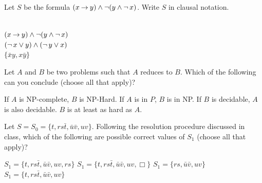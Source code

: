 \documentclass[addpoints]{exam}
\begin{document}
\begin{questions}
\question[2] Let $S$ be the formula $(x \mathbin{\rightarrow} y) \land \mathop{\neg} (y \land \mathop{\neg} x)$. Write $S$ in clausal notation.
\begin{solution}
~\\
$(x \mathbin{\rightarrow} y)\land \mathop{\neg} (y \land \mathop{\neg} x)$\\
$(\mathop{\neg} x \lor y) \land (\mathop{\neg} y \lor x)$\\
$\{\bar{x}y,x\bar{y}\}$\\
\end{solution}
\vspace{30mm}

\question[2] Let $A$ and $B$ be two problems such that $A$ reduces to $B$. Which of
the following can you conclude (choose all that apply)?
\begin{checkboxes}
\CorrectChoice If $A$ is NP-complete, $B$ is NP-Hard.
\choice If $A$ is in $P$, $B$ is in NP. 
\CorrectChoice If $B$ is decidable, $A$ is also decidable.
\CorrectChoice $B$ is at least as hard as $A$.
\end{checkboxes}

\vspace{10mm}
\question[2] Let $S = S_0 = \{t,rs\bar{t},\bar{u}\bar{v},uv\}$. Following the resolution
procedure discussed in class, which of the following are possible correct
values of $S_1$ (choose all that apply)?
\begin{checkboxes}
\CorrectChoice $S_1 = \{t,rs\bar{t},\bar{u}\bar{v},uv, rs\}$ 
\choice $S_1 = \{t,rs\bar{t},\bar{u}\bar{v},uv, \Box \}$ 
\choice $S_1 = \{rs,\bar{u}\bar{v},uv\}$ 
\CorrectChoice $S_1 = \{t,rs\bar{t},\bar{u}\bar{v},uv\}$ 
\end{checkboxes}


\vspace{5mm}

\end{questions}
\end{document}
